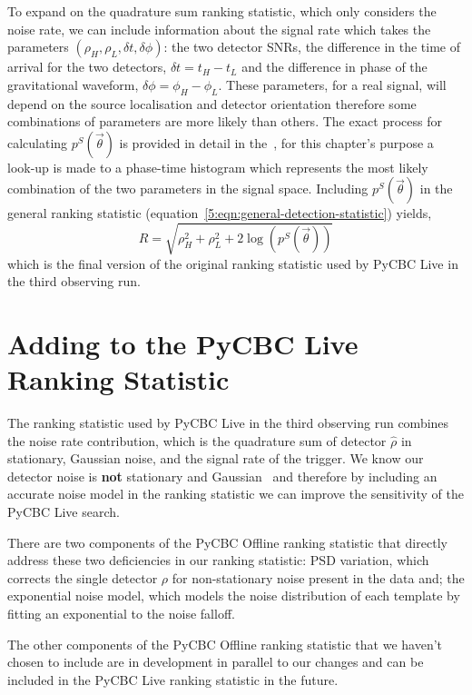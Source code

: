 To expand on the quadrature sum ranking statistic, which only considers the noise rate, we can include information about the signal rate which takes the parameters $(\rho_{H}, \rho_{L}, \delta t, \delta \phi)$: the two detector SNRs, the difference in the time of arrival for the two detectors, $\delta t = t_{H} - t_{L}$ and the difference in phase of the gravitational waveform, $\delta \phi = \phi_{H} - \phi_{L}$. These parameters, for a real signal, will depend on the source localisation and detector orientation therefore some combinations of parameters are more likely than others. The exact process for calculating $p^{S}(\Vec{\theta})$ is provided in detail in the~\cite{PyCBC:2017}, for this chapter's purpose a look-up is made to a phase-time histogram which represents the most likely combination of the two parameters in the signal space. Including $p^{S}(\Vec{\theta})$ in the general ranking statistic (equation~\ref{5:eqn:general-detection-statistic}) yields,
%
\begin{equation}
    R = \sqrt{\rho^{2}_{H} + \rho^{2}_{L} + 2 \log\left(p^{S}(\Vec{\theta})\right)}
    \label{5:eqn:original-statistic}
\end{equation}
%
which is the final version of the original ranking statistic used by PyCBC Live in the third observing run.

\section{\label{5:new-additions}Adding to the PyCBC Live Ranking Statistic}

The ranking statistic used by PyCBC Live in the third observing run combines the noise rate contribution, which is the quadrature sum of detector $\hat{\rho}$ in stationary, Gaussian noise, and the signal rate of the trigger. We know our detector noise is \textbf{not} stationary and Gaussian~\cite{LIGO_data_quality:2015} and therefore by including an accurate noise model in the ranking statistic we can improve the sensitivity of the PyCBC Live search.

There are two components of the PyCBC Offline ranking statistic that directly address these two deficiencies in our ranking statistic: PSD variation, which corrects the single detector $\rho$ for non-stationary noise present in the data and; the exponential noise model, which models the noise distribution of each template by fitting an exponential to the noise falloff.

The other components of the PyCBC Offline ranking statistic that we haven't chosen to include are in development in parallel to our changes and can be included in the PyCBC Live ranking statistic in the future.

